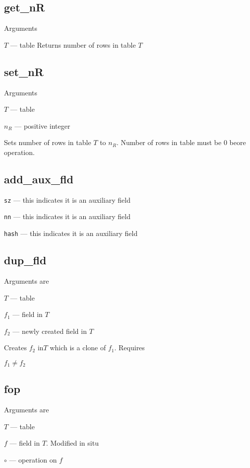 \subsection{get\_nR}
\label{get_nR}
Arguments
\be
\item \(T\) --- table
\ee
Returns number of rows in table \(T\)

\subsection{set\_nR}
\label{set_nR}
Arguments
\be
\item \(T\) --- table
\item \(n_R\) --- positive integer
\ee

Sets number of rows in table \(T\) to \(n_R\). Number of rows in table
must be 0 beore operation.

\subsection{add\_aux\_fld}
\label{add_aux_fld}

\be
\item \verb+sz+ --- this indicates it is an auxiliary field
\item \verb+nn+ --- this indicates it is an auxiliary field
\item \verb+hash+ --- this indicates it is an auxiliary field
\ee

\subsection{dup\_fld}
\label{dup_fld}
Arguments are 
\be
\item \(T\) --- table
\item \(f_1\) --- field in \(T\)
\item \(f_2\) --- newly created field in \(T\)
\ee

Creates \(f_2\) in\(T\) which is a clone of \(f_1\). Requires
\be
\item \(f_1 \neq f_2\)
\ee

\subsection{fop}
\label{fop}
Arguments are 
\be
\item \(T\) --- table
\item \(f\) --- field in \(T\). Modified in situ
\item \(\circ\)  --- operation on \(f\) 
\ee

